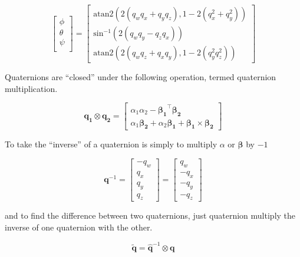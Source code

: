 \documentclass[paper=a4, fontsize=11pt]{scrartcl} %
\numberwithin{equation}{section} %
\numberwithin{figure}{section} %
\numberwithin{table}{section} %
\begin{document}
\begin{equation}
	\begin{bmatrix}
		\phi \\
		\theta \\
		\psi \\
	\end{bmatrix}
	=
	\begin{bmatrix}
		\textrm{atan2}\left( 2\left(q_wq_x + q_yq_z\right),1-2\left(q_x^2+q_y^2\right) \right) \\
		\textrm{sin}^{-1}\left( 2 \left( q_wq_y - q_zq_x \right)  \right) \\
		\textrm{atan2}\left( 2 \left( q_wq_z + q_xq_y \right), 1 - 2 \left( q_y^2 q_z^2 \right)  \right) 
	\end{bmatrix}
\end{equation}

Quaternions are ``closed'' under the following operation, termed quaternion multiplication.

\begin{equation}
	\bm{q_1} \otimes \bm{q_2} = \begin{bmatrix}
									\alpha_1\alpha_2 - \bm{\beta_1}^\top\bm{\beta_2} \\
									\alpha_1\bm{\beta_2} + \alpha_2\bm{\beta_1} + \bm{\beta_1} \times \bm{\beta_2}
								\end{bmatrix}
\end{equation}

To take the ``inverse'' of a quaternion is simply to multiply $\alpha$ or $\bm{\beta}$ by $-1$

\begin{equation}
	\bm{q}^{-1} = \begin{bmatrix}
				-q_w \\
				q_x \\
				q_y \\
				q_z 
			 \end{bmatrix} 
			 	= \begin{bmatrix}
				q_w \\
				-q_x \\
				-q_y \\
				-q_z 
			 \end{bmatrix} 
\end{equation}

and to find the difference between two quaternions, just quaternion multiply the inverse of one quaternion with the other.

\begin{equation}
	\tilde{\bm{q}} = \hat{\bm{q}}^{-1} \otimes \bm{q}
\end{equation}
\end{document}
